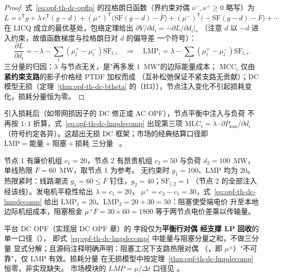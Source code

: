 \begin{proof}
式~\eqref{eq:opf-th-dc-opflp} 的拉格朗日函数（界约束对偶
$\nu^-,\nu^+\ge0$ 略写）为
\begin{equation}
L=c^{\mathsf T}g+\lambda\,e^{\mathsf T}(g-d)
+(\mu^+)^{\mathsf T}\bigl(\mathrm{SF}(g-d)-\overline F\bigr)
+(\mu^-)^{\mathsf T}\bigl(-\mathrm{SF}(g-d)-\overline F\bigr)+\cdots
\end{equation}
在 LICQ 成立的最优基处，包络定理给出
$\partial V/\partial d_i=-\partial L/\partial d_i\big|_*$
（注意 $d$ 以 $-d$ 进入约束，故值函数梯度与拉格朗日对 $d$ 的偏导差
一个符号）：
\begin{equation}
\frac{\partial L}{\partial d_i}
=-\lambda-\sum_l(\mu^+_l-\mu^-_l)\mathrm{SF}_{l,i}
\quad\Longrightarrow\quad
\mathrm{LMP}_i=\lambda-\sum_l(\mu^+_l-\mu^-_l)\mathrm{SF}_{l,i}.
\end{equation}
三分量的归因：$\lambda$ 与节点无关，是"再多发 $1$~MW"的边际能量成本；
$\mathrm{MCC}_i$ 仅由\textbf{紧约束支路}的影子价格经 PTDF 加权而成
（互补松弛保证不紧支路无贡献）；DC 模型无损（定理~\ref{thm:opf-th-dc-btheta}
的（H3）），节点注入变化不引起损耗变化，损耗分量恒为零。
\end{proof}

\begin{remark}[损耗分量的非零化]\label{rem:opf-th-dc-loss}
引入损耗后（如带网损因子的 DC 修正或 AC OPF），节点平衡中注入与负荷
不再按 $1:1$ 折算，式~\eqref{eq:opf-th-dc-lmpdecomp} 出现第三项
$\mathrm{MLC}_i=\lambda\cdot\partial P_{\mathrm{loss}}/\partial d_i$
（符号约定各异）。这超出无损 DC 框架；市场的经典结算口径即
$\mathrm{LMP}=\text{能量}+\text{阻塞}+\text{损耗}$ 三分量
~\cite{opfdc:schweppe-spot,opfdc:christie}。
\end{remark}

\begin{example}[两节点阻塞算例]\label{ex:opf-th-dc-twobus}
节点 1 有廉价机组 $c_1=20$，节点 2 有昂贵机组 $c_2=50$ 与负荷
$d_2=100$~MW，单线热限 $\overline F=60$~MW，取节点 1 为参考。
无约束时 $g_1=100$、LMP 均为 $20$。热限紧时：线路潮流
$g_1=60\le\overline F$ 钉住，$g_2=40$；$\mathrm{SF}_{l,2}=1$
（节点 2 的全部注入经该线）。发电机平稳性给出 $\lambda=c_1=20$，
$\mu^+=c_2-c_1=30$，式~\eqref{eq:opf-th-dc-lmpdecomp} 给出
$\mathrm{LMP}_1=20$、$\mathrm{LMP}_2=20+30=50$：阻塞使受端电价
升至本地边际机组成本，阻塞租金 $\mu^+\overline F=30\times60=1800$
等于两节点电价差乘以传输量。
\end{example}

\begin{gapnote}
平台 DC OPF（实现层 DC OPF 章）的  字段仅为\textbf{平衡行对偶
经支撑 LP 回收}的单一口径（），
即式~\eqref{eq:opf-th-dc-lmpdecomp} 中能量与阻塞分量之和，不做三分量
显式分解；且源码注释明确声明：阻塞工况下支路热限对偶
（，即 $\mu^\pm$）"不可靠"，仅 LMP 有效。损耗分量
在无损模型中按定理~\ref{thm:opf-th-dc-lmpdecomp} 恒零，非实现缺失。
市场模块的 $LMP=\mu/\Delta t$ 口径见
。
\end{gapnote}

